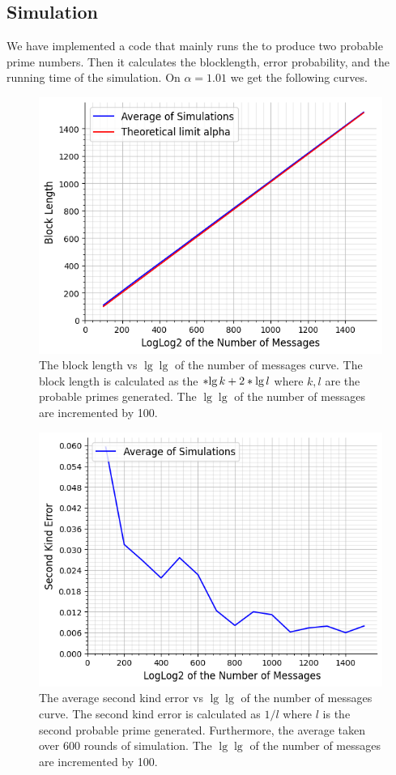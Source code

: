 \subsection{Simulation}
We have implemented a code that mainly runs the  to produce two probable prime numbers. Then it calculates the blocklength, error probability, and the running time of the simulation. On \(\alpha = 1.01\) we get the following curves.
\begin{figure}
	\includegraphics*[height = 0.4 \textheight]{graphic/msg47.png}
	\caption{The block length vs \(\lg \lg \) of the number of messages curve. The block length is calculated as the \(\ceil{\lg k} + 2 \ceil{\lg l}\) where \(k,l\) are the probable primes generated. The \(\lg \lg \) of the number of messages are incremented by 100.}
\end{figure}
\begin{figure}
	\includegraphics*[height = 0.4 \textheight]{graphic/errwo47.png}
	\caption{The average second kind error vs  \(\lg \lg \) of the number of messages curve. The second kind error is calculated as \(1/l\) where \(l\) is the second probable prime generated. Furthermore, the average taken over 600 rounds of simulation. The \(\lg \lg \) of the number of messages are incremented by 100.}
\end{figure}
